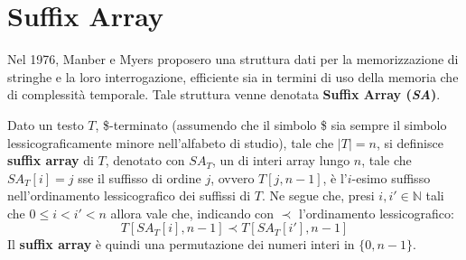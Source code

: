 \section{Suffix Array}
Nel 1976, Manber e Myers \cite{sa} proposero una struttura dati per la
memorizzazione di 
stringhe e la loro interrogazione, efficiente sia in termini di uso della
memoria che di complessità temporale. Tale struttura venne denotata
\textbf{Suffix Array (\textit{SA})}.
\begin{definizione}
  Dato un testo $T$, \$-terminato (assumendo che il simbolo \$ sia sempre il
  simbolo lessicograficamente minore nell'alfabeto di studio), tale che $|T|=n$,
  si definisce \textbf{suffix 
    array} di $T$, denotato con $SA_T$, un di interi array lungo $n$, tale che
  $SA_T[i]=j$ sse il suffisso di ordine $j$, ovvero $T[j,n-1]$, è
  l'$i$-esimo suffisso nell’ordinamento lessicografico dei suffissi di $T$. Ne
  segue che, presi $i,i'\in \mathbb{N}$
  tali che $0\leq i < i' < n$ allora vale che, indicando con $\prec$
  l'ordinamento lessicografico:
  \begin{equation}
    \label{eq:saord}
    T[SA_T[i],n-1] \prec T[SA_T[i'],n-1]
  \end{equation}
  Il \textbf{suffix array} è quindi una permutazione dei numeri interi in
  $\{0,n-1\}$. 
\end{definizione}
